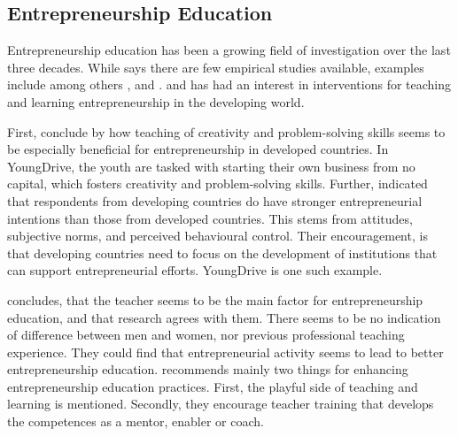 \subsection{Entrepreneurship Education}

%

%




Entrepreneurship education has been a growing field of investigation over the last three decades. While \cite{dickson} says there are few empirical studies available, examples include among others \cite{kuratko}, \cite{pittaway} and \cite{bae}. \cite{oviawe} and \cite{iakovleva} has had an interest in interventions for teaching and learning entrepreneurship in the developing world.



First, \cite{oviawe} conclude by how teaching of creativity and problem-solving skills seems to be especially beneficial for entrepreneurship in developed countries. In YoungDrive, the youth are tasked with starting their own business from no capital, which fosters creativity and problem-solving skills. Further, \cite{iakovleva} indicated that respondents from developing countries do have stronger entrepreneurial intentions than those from developed countries. This stems from attitudes, subjective norms, and perceived behavioural control. Their encouragement, is that developing countries need to focus on the development of institutions that can support entrepreneurial efforts. YoungDrive is one such example.

\cite{ruskovaara} concludes, that the teacher seems to be the main factor for entrepreneurship education, and that research agrees with them. There seems to be no indication of difference between men and women, nor previous professional teaching experience. They could find that entrepreneurial activity seems to lead to better entrepreneurship education. \cite{dickson} recommends mainly two things for enhancing entrepreneurship education practices. First, the playful side of teaching and learning is mentioned. Secondly, they encourage teacher training that develops the competences as a mentor, enabler or coach.
